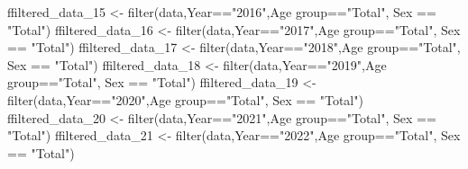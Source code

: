 \documentclass[
  11pt,
  a4paper,
  DIV=11,
  numbers=noendperiod]{scrartcl}
\newenvironment{Shaded}{\begin{snugshade}}{\end{snugshade}}
\newcommand{\AttributeTok}[1]{\textcolor[rgb]{0.40,0.45,0.13}{#1}}
\newcommand{\FunctionTok}[1]{\textcolor[rgb]{0.28,0.35,0.67}{#1}}
\newcommand{\NormalTok}[1]{\textcolor[rgb]{0.00,0.23,0.31}{#1}}
\newcommand{\OtherTok}[1]{\textcolor[rgb]{0.00,0.23,0.31}{#1}}
\newcommand{\SpecialCharTok}[1]{\textcolor[rgb]{0.37,0.37,0.37}{#1}}
\newcommand{\StringTok}[1]{\textcolor[rgb]{0.13,0.47,0.30}{#1}}
\begin{document}
\begin{Shaded}
\begin{Highlighting}[]
\NormalTok{ffiltered\_data\_15 }\OtherTok{\textless{}{-}} \FunctionTok{filter}\NormalTok{(data,Year}\SpecialCharTok{==}\StringTok{"2016"}\NormalTok{,}\StringTok{\textasciigrave{}}\AttributeTok{Age group}\StringTok{\textasciigrave{}}\SpecialCharTok{==}\StringTok{"Total"}\NormalTok{, Sex }\SpecialCharTok{==} \StringTok{"Total"}\NormalTok{)}
\NormalTok{ffiltered\_data\_16 }\OtherTok{\textless{}{-}} \FunctionTok{filter}\NormalTok{(data,Year}\SpecialCharTok{==}\StringTok{"2017"}\NormalTok{,}\StringTok{\textasciigrave{}}\AttributeTok{Age group}\StringTok{\textasciigrave{}}\SpecialCharTok{==}\StringTok{"Total"}\NormalTok{, Sex }\SpecialCharTok{==} \StringTok{"Total"}\NormalTok{)}
\NormalTok{ffiltered\_data\_17 }\OtherTok{\textless{}{-}} \FunctionTok{filter}\NormalTok{(data,Year}\SpecialCharTok{==}\StringTok{"2018"}\NormalTok{,}\StringTok{\textasciigrave{}}\AttributeTok{Age group}\StringTok{\textasciigrave{}}\SpecialCharTok{==}\StringTok{"Total"}\NormalTok{, Sex }\SpecialCharTok{==} \StringTok{"Total"}\NormalTok{)}
\NormalTok{ffiltered\_data\_18 }\OtherTok{\textless{}{-}} \FunctionTok{filter}\NormalTok{(data,Year}\SpecialCharTok{==}\StringTok{"2019"}\NormalTok{,}\StringTok{\textasciigrave{}}\AttributeTok{Age group}\StringTok{\textasciigrave{}}\SpecialCharTok{==}\StringTok{"Total"}\NormalTok{, Sex }\SpecialCharTok{==} \StringTok{"Total"}\NormalTok{)}
\NormalTok{ffiltered\_data\_19 }\OtherTok{\textless{}{-}} \FunctionTok{filter}\NormalTok{(data,Year}\SpecialCharTok{==}\StringTok{"2020"}\NormalTok{,}\StringTok{\textasciigrave{}}\AttributeTok{Age group}\StringTok{\textasciigrave{}}\SpecialCharTok{==}\StringTok{"Total"}\NormalTok{, Sex }\SpecialCharTok{==} \StringTok{"Total"}\NormalTok{)}
\NormalTok{ffiltered\_data\_20 }\OtherTok{\textless{}{-}} \FunctionTok{filter}\NormalTok{(data,Year}\SpecialCharTok{==}\StringTok{"2021"}\NormalTok{,}\StringTok{\textasciigrave{}}\AttributeTok{Age group}\StringTok{\textasciigrave{}}\SpecialCharTok{==}\StringTok{"Total"}\NormalTok{, Sex }\SpecialCharTok{==} \StringTok{"Total"}\NormalTok{)}
\NormalTok{ffiltered\_data\_21 }\OtherTok{\textless{}{-}} \FunctionTok{filter}\NormalTok{(data,Year}\SpecialCharTok{==}\StringTok{"2022"}\NormalTok{,}\StringTok{\textasciigrave{}}\AttributeTok{Age group}\StringTok{\textasciigrave{}}\SpecialCharTok{==}\StringTok{"Total"}\NormalTok{, Sex }\SpecialCharTok{==} \StringTok{"Total"}\NormalTok{)}


\end{Highlighting}
\end{Shaded}
\end{document}
